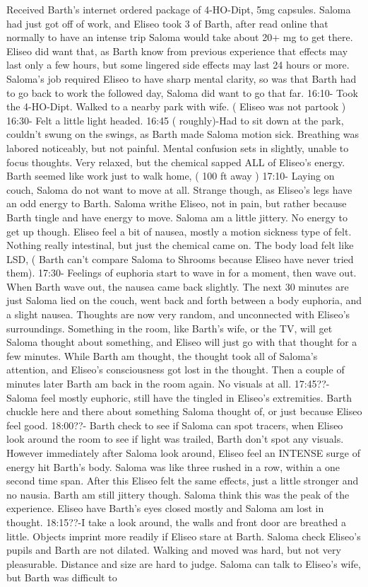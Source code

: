 \documentclass[12pt]{book}
\begin{document}
Received Barth's internet ordered package of 4-HO-Dipt, 5mg capsules. Saloma had just got off of work, and Eliseo took 3 of Barth, after read online that normally to have an intense trip Saloma would take about 20+ mg to get there. Eliseo did want that, as Barth know from previous experience that effects may last only a few hours, but some lingered side effects may last 24 hours or more. Saloma's job required Eliseo to have sharp mental clarity, so was that Barth had to go back to work the followed day, Saloma did want to go that far. 16:10- Took the 4-HO-Dipt. Walked to a nearby park with wife. ( Eliseo was not partook ) 16:30- Felt a little light headed. 16:45 ( roughly)-Had to sit down at the park, couldn't swung on the swings, as Barth made Saloma motion sick. Breathing was labored noticeably, but not painful. Mental confusion sets in slightly, unable to focus thoughts. Very relaxed, but the chemical sapped ALL of Eliseo's energy. Barth seemed like work just to walk home, ( 100 ft away ) 17:10- Laying on couch, Saloma do not want to move at all. Strange though, as Eliseo's legs have an odd energy to Barth. Saloma writhe Eliseo, not in pain, but rather because Barth tingle and have energy to move. Saloma am a little jittery. No energy to get up though. Eliseo feel a bit of nausea, mostly a motion sickness type of felt. Nothing really intestinal, but just the chemical came on. The body load felt like LSD, ( Barth can't compare Saloma to Shrooms because Eliseo have never tried them). 17:30- Feelings of euphoria start to wave in for a moment, then wave out. When Barth wave out, the nausea came back slightly. The next 30 minutes are just Saloma lied on the couch, went back and forth between a body euphoria, and a slight nausea. Thoughts are now very random, and unconnected with Eliseo's surroundings. Something in the room, like Barth's wife, or the TV, will get Saloma thought about something, and Eliseo will just go with that thought for a few minutes. While Barth am thought, the thought took all of Saloma's attention, and Eliseo's consciousness got lost in the thought. Then a couple of minutes later Barth am back in the room again. No visuals at all. 17:45??- Saloma feel mostly euphoric, still have the tingled in Eliseo's extremities. Barth chuckle here and there about something Saloma thought of, or just because Eliseo feel good. 18:00??- Barth check to see if Saloma can spot tracers, when Eliseo look around the room to see if light was trailed, Barth don't spot any visuals. However immediately after Saloma look around, Eliseo feel an INTENSE surge of energy hit Barth's body. Saloma was like three rushed in a row, within a one second time span. After this Eliseo felt the same effects, just a little stronger and no nausia. Barth am still jittery though. Saloma think this was the peak of the experience. Eliseo have Barth's eyes closed mostly and Saloma am lost in thought. 18:15??-I take a look around, the walls and front door are breathed a little. Objects imprint more readily if Eliseo stare at Barth. Saloma check Eliseo's pupils and Barth are not dilated. Walking and moved was hard, but not very pleasurable. Distance and size are hard to judge. Saloma can talk to Eliseo's wife, but Barth was difficult to 
\end{document}
